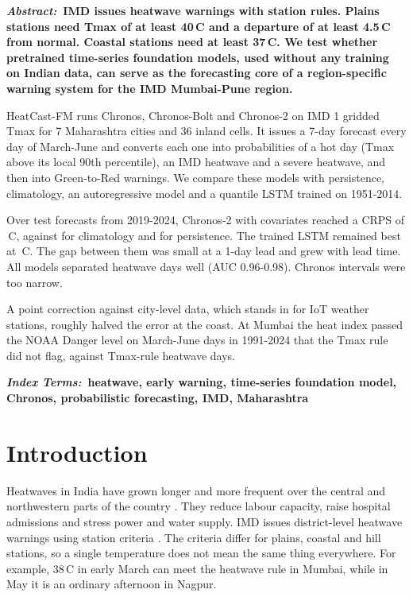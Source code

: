 \documentclass[conference,10pt]{IEEEtran}
\begin{document}
{\small\bfseries\noindent\textit{Abstract:}\ IMD issues heatwave warnings with station rules. Plains stations need Tmax of at least 40\,\textdegree C and a departure of at least 4.5\,\textdegree C from normal. Coastal stations need at least 37\,\textdegree C. We test whether pretrained time-series foundation models, used without any training on Indian data, can serve as the forecasting core of a region-specific warning system for the IMD Mumbai-Pune region.

HeatCast-FM runs Chronos, Chronos-Bolt and Chronos-2 on IMD 1\textdegree{} gridded Tmax for 7 Maharashtra cities and 36 inland cells. It issues a 7-day forecast every day of March-June and converts each one into probabilities of a hot day (Tmax above its local 90th percentile), an IMD heatwave and a severe heatwave, and then into Green-to-Red warnings. We compare these models with persistence, climatology, an autoregressive model and a quantile LSTM trained on 1951-2014.

Over \NTestForecasts{} test forecasts from 2019-2024, Chronos-2 with covariates reached a CRPS of \CRPSChronostwocov\,\textdegree C, against \CRPSClimatology{} for climatology and \CRPSPersistence{} for persistence. The trained LSTM remained best at \CRPSQuantileLSTM\,\textdegree C. The gap between them was small at a 1-day lead and grew with lead time. All models separated heatwave days well (AUC 0.96-0.98). Chronos intervals were too narrow.

A point correction against city-level data, which stands in for IoT weather stations, roughly halved the error at the coast. At Mumbai the heat index passed the NOAA Danger level on \HumidMumbai{} March-June days in 1991-2024 that the Tmax rule did not flag, against \TmaxhwMumbai{} Tmax-rule heatwave days.
\par}\smallskip

{\small\bfseries\noindent\textit{Index Terms:}\ heatwave, early warning, time-series foundation model, Chronos, probabilistic forecasting, IMD, Maharashtra
\par}\medskip

\section{Introduction}
Heatwaves in India have grown longer and more frequent over the central and northwestern parts of the country \cite{rohini2016heat,pai2013heat}. They reduce labour capacity, raise hospital admissions and stress power and water supply. IMD issues district-level heatwave warnings using station criteria \cite{imdfaq}. The criteria differ for plains, coastal and hill stations, so a single temperature does not mean the same thing everywhere. For example, 38\,\textdegree C in early March can meet the heatwave rule in Mumbai, while in May it is an ordinary afternoon in Nagpur.
\end{document}
